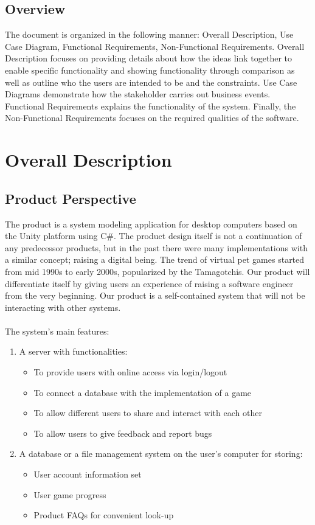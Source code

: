 \documentclass[]{article}
\begin{document}
\subsection{Overview}
\label{sub:overview}
The document is organized in the following manner: Overall Description, Use 
Case Diagram, Functional Requirements, Non-Functional Requirements. Overall 
Description focuses on providing details about how the ideas link together to 
enable specific functionality and showing functionality through comparison as 
well as outline who the users are intended to be and the constraints. Use Case 
Diagrams demonstrate how the stakeholder carries out business events. Functional 
Requirements explains the functionality of the system. Finally, the 
Non-Functional Requirements focuses on the required qualities of the software.


\section{Overall Description}
\label{sec:overall_description}

\subsection{Product Perspective}
\label{sub:product_perspective}
The product is a system modeling application for desktop computers based on the 
Unity platform using C\#. The product design itself is not a continuation of any 
predecessor products, but in the past there were many implementations with a 
similar concept; raising a digital being. The trend of virtual pet games started 
from mid 1990s to early 2000s, popularized by the Tamagotchis. Our product will 
differentiate itself by giving users an experience of raising a software 
engineer from the very beginning. Our product is a self-contained system that 
will not be interacting with other systems.
\\\\
The system’s main features:
\begin{enumerate}[1)]
    \item A server with functionalities:
    \begin{itemize}
        \item To provide users with online access via login/logout
        \item To connect a database with the implementation of a game
        \item To allow different users to share and interact with each other
        \item To allow users to give feedback and report bugs
    \end{itemize}
    \item A database or a file management system on the user’s computer for 
    storing:
    \begin{itemize}
        \item User account information set
        \item User game progress
        \item Product FAQs for convenient look-up
    \end{itemize}
\end{enumerate}
\end{document}
